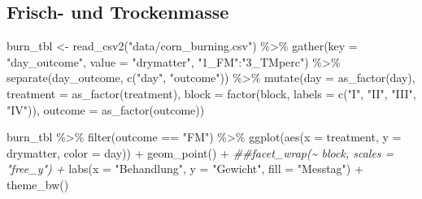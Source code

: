 \documentclass[
  letterpaper,
]{scrbook}
\newenvironment{Shaded}{\begin{snugshade}}{\end{snugshade}}
\newcommand{\AttributeTok}[1]{\textcolor[rgb]{0.40,0.45,0.13}{#1}}
\newcommand{\DocumentationTok}[1]{\textcolor[rgb]{0.37,0.37,0.37}{\textit{#1}}}
\newcommand{\FunctionTok}[1]{\textcolor[rgb]{0.28,0.35,0.67}{#1}}
\newcommand{\NormalTok}[1]{\textcolor[rgb]{0.00,0.23,0.31}{#1}}
\newcommand{\OtherTok}[1]{\textcolor[rgb]{0.00,0.23,0.31}{#1}}
\newcommand{\SpecialCharTok}[1]{\textcolor[rgb]{0.37,0.37,0.37}{#1}}
\newcommand{\StringTok}[1]{\textcolor[rgb]{0.13,0.47,0.30}{#1}}
\begin{document}
\hypertarget{frisch--und-trockenmasse}{%
\subsection{Frisch- und Trockenmasse}\label{frisch--und-trockenmasse}}

\begin{Shaded}
\begin{Highlighting}[]
\NormalTok{burn\_tbl }\OtherTok{\textless{}{-}} \FunctionTok{read\_csv2}\NormalTok{(}\StringTok{"data/corn\_burning.csv"}\NormalTok{) }\SpecialCharTok{\%\textgreater{}\%} 
  \FunctionTok{gather}\NormalTok{(}\AttributeTok{key =} \StringTok{"day\_outcome"}\NormalTok{, }\AttributeTok{value =} \StringTok{"drymatter"}\NormalTok{, }\StringTok{"1\_FM"}\SpecialCharTok{:}\StringTok{"3\_TMperc"}\NormalTok{) }\SpecialCharTok{\%\textgreater{}\%}
  \FunctionTok{separate}\NormalTok{(day\_outcome, }\FunctionTok{c}\NormalTok{(}\StringTok{"day"}\NormalTok{, }\StringTok{"outcome"}\NormalTok{)) }\SpecialCharTok{\%\textgreater{}\%} 
  \FunctionTok{mutate}\NormalTok{(}\AttributeTok{day =} \FunctionTok{as\_factor}\NormalTok{(day),}
         \AttributeTok{treatment =} \FunctionTok{as\_factor}\NormalTok{(treatment),}
         \AttributeTok{block =} \FunctionTok{factor}\NormalTok{(block, }\AttributeTok{labels =} \FunctionTok{c}\NormalTok{(}\StringTok{"I"}\NormalTok{, }\StringTok{"II"}\NormalTok{, }\StringTok{"III"}\NormalTok{, }\StringTok{"IV"}\NormalTok{)),}
         \AttributeTok{outcome =} \FunctionTok{as\_factor}\NormalTok{(outcome)) }
\end{Highlighting}
\end{Shaded}

\begin{Shaded}
\begin{Highlighting}[]
\NormalTok{burn\_tbl }\SpecialCharTok{\%\textgreater{}\%} 
  \FunctionTok{filter}\NormalTok{(outcome }\SpecialCharTok{==} \StringTok{"FM"}\NormalTok{) }\SpecialCharTok{\%\textgreater{}\%} 
  \FunctionTok{ggplot}\NormalTok{(}\FunctionTok{aes}\NormalTok{(}\AttributeTok{x =}\NormalTok{ treatment, }\AttributeTok{y =}\NormalTok{ drymatter, }\AttributeTok{color =}\NormalTok{ day)) }\SpecialCharTok{+}
  \FunctionTok{geom\_point}\NormalTok{() }\SpecialCharTok{+}
  \DocumentationTok{\#\#facet\_wrap(\textasciitilde{} block, scales = "free\_y") +}
  \FunctionTok{labs}\NormalTok{(}\AttributeTok{x =} \StringTok{"Behandlung"}\NormalTok{, }\AttributeTok{y =} \StringTok{"Gewicht"}\NormalTok{, }\AttributeTok{fill =} \StringTok{"Messtag"}\NormalTok{) }\SpecialCharTok{+}
  \FunctionTok{theme\_bw}\NormalTok{()}
\end{Highlighting}
\end{Shaded}
\end{document}
